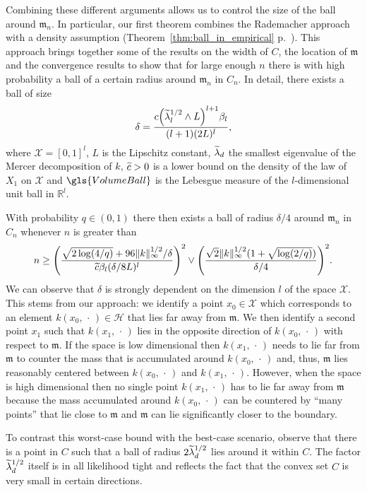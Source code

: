 \documentclass[10pt]{amsart}
\theoremstyle{definition}\newtheorem{defi}[theo]{Definition}\newtheorem{rema}[theo]{Remark}\newtheorem{exam}[theo]{Example}\newtheorem{exem}[theo]{Example}\newtheorem{nota}[theo]{Notation}
\theoremstyle{remark}
\newcommand{\R}{\mathbb{R}}
\newcommand{\X}{\mathcal{X}}
\newcommand{\cH}{\mathcal{H}}
\newcommand{\mean}{\mathfrak{m}}
\let\oldtilde\tilde
\renewcommand*{\tilde}[1]{\mathchoice{\widetilde{#1}}{\widetilde{#1}}{\oldtilde{#1}}{\oldtilde{#1}}}
\let\originalleft\left
\let\originalright\right
\renewcommand{\left}{\mathopen{}\mathclose\bgroup\originalleft}
\renewcommand{\right}{\aftergroup\egroup\originalright}
\begin{document}
Combining these different arguments allows us to control the size of the ball around $\mean_n$. In particular, our first theorem combines the Rademacher approach with a density assumption (Theorem~\ref{thm:ball_in_empirical} p.~\pageref{thm:ball_in_empirical}). This approach brings together some of the results on the width of $C$, the location of $\mean$ and the convergence results to show that for large enough $n$ there is with high probability a ball of a certain radius around $\mean_n$ in $C_n$. In detail, there exists a ball of size
\[
\delta = \frac{c\left(\tilde \lambda_l^{1/2} \wedge L\right)^{l+1}\beta_l}{(l+1) (2L)^l},
\]
where $\X = [0,1]^l$, $L$ is the Lipschitz constant, $\tilde \lambda_d$ the smallest eigenvalue of the Mercer decomposition of $k$, $\tilde c > 0$ is a lower bound on the density of the law of $X_1$ on $\X$ and $\gls{VolumeBall}$ is the Lebesgue measure of the $l$-dimensional unit ball in $\R^l$.

With probability $q\in (0,1)$ there then exists a ball of radius $\delta/4$ around $\mean_n$ in $C_n$ whenever $n$ is greater than
\[
n \geq \left(\frac{\sqrt{2\log(4/q)} + 96 \|k\|_\infty^{1/2}/\delta}{\tilde c\beta_l(\delta/8L)^l}\right)^{2} \vee
\left(\frac{\sqrt{2} \|k\|^{1/2}_\infty (1 + \sqrt{\log(2/q)})}{\delta/4}\right)^{2}.
\]
We can observe that $\delta$ is strongly dependent on the dimension $l$ of the space $\X$. This stems from our approach: we identify a point $x_0 \in \X$ which corresponds to an element $k(x_0,\,\cdot\,) \in \cH$ that lies far away from $\mean$. We then identify a second point $x_1$ such that $k(x_1,\,\cdot\,)$ lies in the opposite direction of $k(x_0,\,\cdot\,)$ with respect to $\mean$. If the space is low dimensional then $k(x_1,\,\cdot\,)$ needs to lie far from $\mean$ to counter the mass that is accumulated around $k(x_0,\,\cdot\,)$ and, thus, $\mean$ lies reasonably centered between $k(x_0,\,\cdot\,)$ and $k(x_1,\,\cdot\,)$. However, when the space is high dimensional then no single point $k(x_1,\,\cdot\,)$ has to lie far away from $\mean$ because the mass accumulated around $k(x_0,\,\cdot\,)$ can be countered by ``many points'' that lie close to $\mean$ and $\mean$ can lie significantly closer to the boundary.

To contrast this worst-case bound with the best-case scenario, observe that there is a point in $C$ such that a ball of radius $2\tilde \lambda_d^{1/2}$ lies around it within $C$. The factor $\tilde \lambda_d^{1/2}$ itself is in all likelihood tight and reflects the fact that the convex set $C$ is very small in certain directions.
\end{document}
